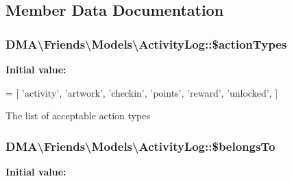 

\subsection{Member Data Documentation}
\hypertarget{classDMA_1_1Friends_1_1Models_1_1ActivityLog_aa60b5fe0e1e7c254827bfa35c69aef9d}{
\subsubsection[{\$action\+Types}]{\setlength{\rightskip}{0pt plus 5cm}D\+M\+A\textbackslash{}\+Friends\textbackslash{}\+Models\textbackslash{}\+Activity\+Log\+::\$action\+Types}}\label{classDMA_1_1Friends_1_1Models_1_1ActivityLog_aa60b5fe0e1e7c254827bfa35c69aef9d}
{\bfseries Initial value\+:}
\begin{DoxyCode}
= [
        \textcolor{stringliteral}{'activity'},
        \textcolor{stringliteral}{'artwork'},
        \textcolor{stringliteral}{'checkin'},
        \textcolor{stringliteral}{'points'},
        \textcolor{stringliteral}{'reward'},
        \textcolor{stringliteral}{'unlocked'},
    ]
\end{DoxyCode}
The list of acceptable action types \hypertarget{classDMA_1_1Friends_1_1Models_1_1ActivityLog_aff637d41ffa73260e1ffc1788f5a98d7}{
\subsubsection[{\$belongs\+To}]{\setlength{\rightskip}{0pt plus 5cm}D\+M\+A\textbackslash{}\+Friends\textbackslash{}\+Models\textbackslash{}\+Activity\+Log\+::\$belongs\+To}}\label{classDMA_1_1Friends_1_1Models_1_1ActivityLog_aff637d41ffa73260e1ffc1788f5a98d7}
{\bfseries Initial value\+:}
